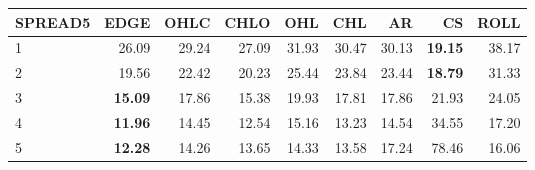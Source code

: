 \begin{table}[ht]
\centering
\begin{tabular}{lrrrrrrrr}
  \hline
SPREAD5 & EDGE & OHLC & CHLO & OHL & CHL & AR & CS & ROLL \\ 
  \hline
1 & 26.09 & 29.24 & 27.09 & 31.93 & 30.47 & 30.13 & \textbf{19.15} & 38.17 \\ 
  2 & 19.56 & 22.42 & 20.23 & 25.44 & 23.84 & 23.44 & \textbf{18.79} & 31.33 \\ 
  3 & \textbf{15.09} & 17.86 & 15.38 & 19.93 & 17.81 & 17.86 & 21.93 & 24.05 \\ 
  4 & \textbf{11.96} & 14.45 & 12.54 & 15.16 & 13.23 & 14.54 & 34.55 & 17.20 \\ 
  5 & \textbf{12.28} & 14.26 & 13.65 & 14.33 & 13.58 & 17.24 & 78.46 & 16.06 \\ 
   \hline
\end{tabular}
\end{table}

